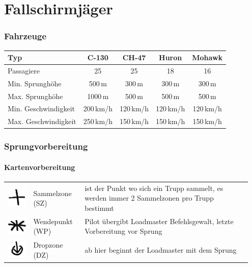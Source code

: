 \pagebreak
\chapter{Fallschirmjäger}

\subsection{Fahrzeuge}
\begin{longtable}{lcccc} 
	\toprule
	Typ & C-130 & CH-47 &	Huron	&	Mohawk \\ 
	\midrule
	Passagiere 	&	25 	&	25 	&	18 	&	16 \\ 
	Min. Sprunghöhe	& 500\,m 	& 300\,m 	&	300\,m	&	300\,m	\\
	Max. Sprunghöhe	&	1000\,m 	&	500\,m 	&	500\,m	&	500\,m \\
	Min. Geschwindigkeit	& 	200\,km/h	&	120\,km/h	&	120\,km/h	&	120\,km/h	\\ 
	Max. Geschwindigkeit	& 	250\,km/h	&	150\,km/h &	150\,km/h &	150\,km/h \\
	\bottomrule 
\end{longtable}

\subsection{Sprungvorbereitung}
\subsubsection*{Kartenvorbereitung}
\begin{tabular}{C{0.1\linewidth}m{0.2\linewidth} m{0.65\linewidth}}
	\includegraphics[scale=0.8]{../img/advanced/fallschirmspringen/sammelzone}	& Sammelzone (SZ)	& ist der Punkt wo sich ein Trupp sammelt, es werden immer 2 Sammelzonen pro Trupp bestimmt\\
	\includegraphics[scale=0.8]{../img/advanced/fallschirmspringen/wendepunkt} 	& 	Wendepunkt (WP) & Pilot übergibt Loadmaster Befehlsgewalt, letzte Vorbereitung vor Sprung\\
	\includegraphics[scale=0.8]{../img/advanced/fallschirmspringen/dropzone}	& Dropzone (DZ) & ab hier beginnt der Loadmaster mit dem Sprung
\end{tabular}

